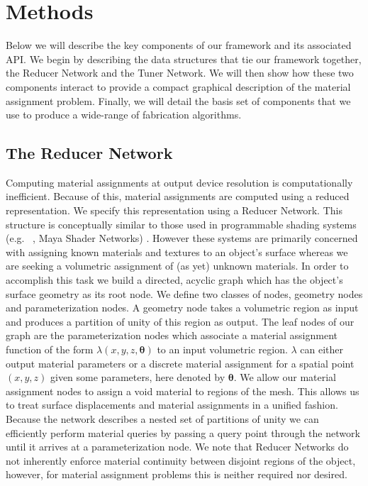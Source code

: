 \documentclass[annual]{acmsiggraph}
\begin{document}
\section{Methods}
Below we will describe the key components of our framework and its associated API. We begin by describing the data structures that tie our framework together, the Reducer Network and the Tuner Network. We will then show how these two components interact to provide a compact graphical description of the material assignment problem. Finally, we will detail the basis set of components that we use to produce a wide-range of fabrication algorithms. 
\subsection{The Reducer Network}
Computing material assignments at output device resolution is computationally inefficient. Because of this, material assignments are computed  using a reduced representation. We specify this representation using a Reducer Network.  This structure is conceptually similar to those used in programmable shading systems (e.g. ~\cite{Cook1984}, Maya Shader Networks) . However these systems are primarily concerned with assigning known materials and textures to an object's surface whereas we are seeking a volumetric assignment of (as yet) unknown materials. In order to accomplish this task we build a directed, acyclic graph which has the object's surface geometry as its root node. We define two classes of nodes, geometry nodes and parameterization nodes. A geometry node takes a volumetric region as input and produces a partition of unity of this region as output. The leaf nodes of our graph are the parameterization nodes which associate a material assignment function of the form $\lambda\left(x,y,z, \boldsymbol{\theta}\right)$ to an input volumetric region. 
$\lambda$ can either output material parameters or a discrete material assignment for a spatial point $\left(x,y,z\right)$ given some parameters, here denoted by $ \boldsymbol{\theta}$. We allow our material assignment nodes to assign a void material to regions of the mesh. This allows us to treat surface displacements and material assignments in a unified fashion. Because the network describes a nested set of partitions of unity we can efficiently perform material queries by passing a query point through the network until it arrives at a parameterization node. We note that Reducer Networks do not inherently enforce material continuity between disjoint regions of the object, however, for material assignment problems this is neither required nor desired. 
\end{document}
